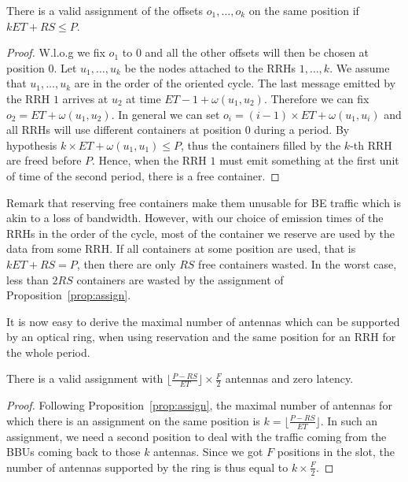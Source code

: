 \begin{proposition}
\label{prop:assign}
There is a valid assignment of the offsets $o_1, \dots, o_k$ on the same position if  $k ET + RS \leq P$.
\end{proposition}
\begin{proof}
 W.l.o.g we fix $o_1$ to $0$ and all the other offsets will then be chosen at position $0$.  Let $u_1,\dots,u_k$ be the nodes attached to the RRHs $1,\dots,k$. We assume that $u_1,\dots,u_k$ are in the order of the oriented cycle. The last message emitted by the RRH $1$ arrives at $u_2$ at time $ET - 1 + \omega(u_1,u_2)$. Therefore we can fix $o_2 =  ET  + \omega(u_1,u_2)$. In general we can set $o_i = (i-1) \times ET + \omega(u_1,u_i)$ and all RRHs will use different containers at position $0$ during a period. By hypothesis $k \times ET + \omega(u_1,u_1) \leq P$, thus
 the containers filled by the $k$-th RRH are freed before $P$. Hence, when the RRH $1$ must emit something at the first unit of time of the second period, there is a free container.
\end{proof}

Remark that reserving free containers make them unusable for BE traffic which is akin to a loss of bandwidth. However, with our choice of emission times of the RRHs in the order of the cycle, most of the container we reserve are used by the data from some RRH. If all containers at some position are used, that is $kET +RS = P$, then there are only $RS$ free containers wasted. In the worst case, less than $2RS$ containers are wasted by the assignment of Proposition~\ref{prop:assign}. 

It is now easy to derive the maximal number of antennas which can be supported by an optical ring, when using reservation and the same position for an RRH for the whole period.

\begin{corollary}
There is a valid assignment with $ \lfloor\frac{P- RS}{ET}\rfloor \times \frac{F}{2}$ antennas and zero latency.
\end{corollary}
\begin{proof}
Following Proposition~\ref{prop:assign}, the maximal number of antennas for which there is an assignment on the same position is $k = \lfloor\frac{P- RS}{ET}\rfloor $.
In such an assignment, we need a second position to deal with the traffic coming from the BBUs coming back to those $k$ antennas. Since we got  $F$ positions in the slot, the number of antennas supported by the ring is thus equal to $k \times \frac{F}{2}$.
\end{proof}

